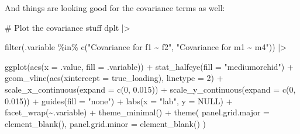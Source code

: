 \documentclass[
  letterpaper,
  DIV=11,
  numbers=noendperiod]{scrreprt}
\newenvironment{Shaded}{\begin{snugshade}}{\end{snugshade}}
\newcommand{\AttributeTok}[1]{\textcolor[rgb]{0.40,0.45,0.13}{#1}}
\newcommand{\CommentTok}[1]{\textcolor[rgb]{0.37,0.37,0.37}{#1}}
\newcommand{\ConstantTok}[1]{\textcolor[rgb]{0.56,0.35,0.01}{#1}}
\newcommand{\DecValTok}[1]{\textcolor[rgb]{0.68,0.00,0.00}{#1}}
\newcommand{\FloatTok}[1]{\textcolor[rgb]{0.68,0.00,0.00}{#1}}
\newcommand{\FunctionTok}[1]{\textcolor[rgb]{0.28,0.35,0.67}{#1}}
\newcommand{\NormalTok}[1]{\textcolor[rgb]{0.00,0.23,0.31}{#1}}
\newcommand{\SpecialCharTok}[1]{\textcolor[rgb]{0.37,0.37,0.37}{#1}}
\newcommand{\StringTok}[1]{\textcolor[rgb]{0.13,0.47,0.30}{#1}}
\begin{document}
And things are looking good for the covariance terms as well:

\begin{Shaded}
\begin{Highlighting}[]
\CommentTok{\# Plot the covariance stuff}
\NormalTok{dplt }\SpecialCharTok{|\textgreater{}}

  \FunctionTok{filter}\NormalTok{(.variable }\SpecialCharTok{\%in\%} \FunctionTok{c}\NormalTok{(}\StringTok{"Covariance for f1 \textasciitilde{} f2"}\NormalTok{, }\StringTok{"Covariance for m1 \textasciitilde{} m4"}\NormalTok{)) }\SpecialCharTok{|\textgreater{}}

  \FunctionTok{ggplot}\NormalTok{(}\FunctionTok{aes}\NormalTok{(}\AttributeTok{x =}\NormalTok{ .value, }\AttributeTok{fill =}\NormalTok{ .variable)) }\SpecialCharTok{+}
  \FunctionTok{stat\_halfeye}\NormalTok{(}\AttributeTok{fill =} \StringTok{"mediumorchid"}\NormalTok{) }\SpecialCharTok{+}
  \FunctionTok{geom\_vline}\NormalTok{(}\FunctionTok{aes}\NormalTok{(}\AttributeTok{xintercept =}\NormalTok{ true\_loading), }\AttributeTok{linetype =} \DecValTok{2}\NormalTok{) }\SpecialCharTok{+} 
  \FunctionTok{scale\_x\_continuous}\NormalTok{(}\AttributeTok{expand =} \FunctionTok{c}\NormalTok{(}\DecValTok{0}\NormalTok{, }\FloatTok{0.015}\NormalTok{)) }\SpecialCharTok{+}
  \FunctionTok{scale\_y\_continuous}\NormalTok{(}\AttributeTok{expand =} \FunctionTok{c}\NormalTok{(}\DecValTok{0}\NormalTok{, }\FloatTok{0.015}\NormalTok{)) }\SpecialCharTok{+}
  \FunctionTok{guides}\NormalTok{(}\AttributeTok{fill =} \StringTok{"none"}\NormalTok{) }\SpecialCharTok{+}
  \FunctionTok{labs}\NormalTok{(}\AttributeTok{x =} \StringTok{"lab"}\NormalTok{,}
     \AttributeTok{y =} \ConstantTok{NULL}\NormalTok{)  }\SpecialCharTok{+}
  \FunctionTok{facet\_wrap}\NormalTok{(}\SpecialCharTok{\textasciitilde{}}\NormalTok{.variable) }\SpecialCharTok{+}
  \FunctionTok{theme\_minimal}\NormalTok{() }\SpecialCharTok{+} 
  \FunctionTok{theme}\NormalTok{(}
    \AttributeTok{panel.grid.major =} \FunctionTok{element\_blank}\NormalTok{(),}
    \AttributeTok{panel.grid.minor =} \FunctionTok{element\_blank}\NormalTok{()}
\NormalTok{  )}
\end{Highlighting}
\end{Shaded}
\end{document}

